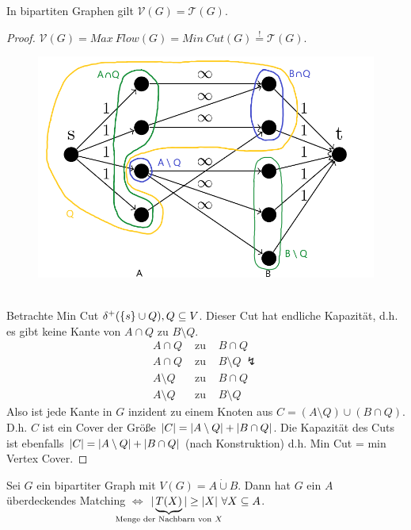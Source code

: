 \begin{satz}
	In bipartiten Graphen gilt $\mathcal{V}(G) = \mathcal{T}(G)$.
\end{satz}
\begin{proof}
	$\mathcal{V}(G) = Max~Flow(G) = Min~Cut(G) \overset{!}{=} \mathcal{T}(G)$. 
		\begin{figure}[ht]
			\begin{center}
				\includegraphics[scale=.3]{images/satz_5_8.png}
			\end{center}
		\end{figure}\\
	Betrachte Min Cut $\delta^+(\{s\}\cup Q), Q \subseteq V$. Dieser Cut hat endliche Kapazität, d.h. es gibt keine Kante von $A \cap Q$ zu $B\setminus Q$.
	\begin{eqnarray*}
		A \cap Q & \text{ zu } & B \cap Q\\
		A \cap Q & \text{ zu } & B \setminus Q ~\lightning\\
		A \setminus Q & \text{ zu } & B \cap Q\\
		A \setminus Q & \text{ zu } & B \setminus Q
	\end{eqnarray*}
	Also ist jede Kante in $G$ inzident zu einem Knoten aus $C = (A\setminus Q)\cup (B \cap Q)$. D.h. $C$ ist ein Cover der Größe $\vert C \vert = \vert A\setminus Q \vert + \vert B\cap Q \vert$. Die Kapazität des Cuts ist ebenfalls $\vert C \vert = \vert A\setminus Q \vert + \vert B\cap Q \vert$ (nach Konstruktion) d.h. Min Cut = min Vertex Cover.
\end{proof}
\begin{satz}
	Sei $G$ ein bipartiter Graph mit $V(G)=A\dot\cup B$. Dann hat $G$ ein $A$ überdeckendes Matching $\Leftrightarrow$ $\card{\underbrace{T(X)}_{\mathclap{\text{Menge der Nachbarn von } X}}} \ge \card{X}~\forall X\subseteq A$.
\end{satz}
